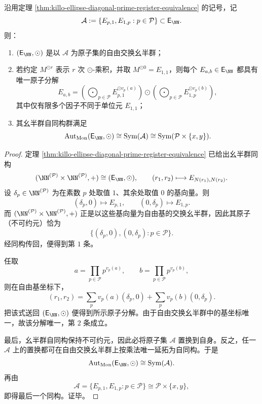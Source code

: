 \begin{theorem}[整数轴对齐椭圆半群的自由交换原子分解]\label{thm:xi-integer-ellipse-free-commutative-monoid}
沿用定理 \ref{thm:killo-ellipse-diagonal-prime-register-equivalence} 的记号，记
\[
\mathcal A:=\{E_{p,1},E_{1,p}:p\in\mathcal P\}\subset \mathsf E_{\NN}.
\]
则：
\begin{enumerate}
  \item \((\mathsf E_{\NN},\odot)\) 是以 \(\mathcal A\) 为原子集的自由交换幺半群；
  \item 若约定 \(M^{\odot r}\) 表示 \(r\) 次 \(\odot\)-乘积，并取 \(M^{\odot 0}=E_{1,1}\)，则每个 \(E_{a,b}\in\mathsf E_{\NN}\) 都具有唯一原子分解
  \[
  E_{a,b}
  =
  \left(\bigodot_{p\in\mathcal P}E_{p,1}^{\odot v_p(a)}\right)
  \odot
  \left(\bigodot_{p\in\mathcal P}E_{1,p}^{\odot v_p(b)}\right),
  \]
  其中仅有限多个因子不同于单位元 \(E_{1,1}\)；
  \item 其幺半群自同构群满足
  \[
  \operatorname{Aut}_{\mathrm{Mon}}(\mathsf E_{\NN},\odot)
  \cong
  \mathrm{Sym}(\mathcal A)
  \cong
  \mathrm{Sym}(\mathcal P\times\{x,y\}).
  \]
\end{enumerate}
\end{theorem}
\begin{proof}
定理 \ref{thm:killo-ellipse-diagonal-prime-register-equivalence} 已给出幺半群同构
\[
(\NN^{(\mathcal P)}\times \NN^{(\mathcal P)},+)
\cong
(\mathsf E_{\NN},\odot),\qquad
(r_1,r_2)\longmapsto E_{N(r_1),N(r_2)}.
\]
设 \(\delta_p\in\NN^{(\mathcal P)}\) 为在素数 \(p\) 处取值 \(1\)、其余处取值 \(0\) 的基向量。则
\[
(\delta_p,0)\longmapsto E_{p,1},
\qquad
(0,\delta_p)\longmapsto E_{1,p}.
\]
而 \((\NN^{(\mathcal P)}\times \NN^{(\mathcal P)},+)\) 正是以这些基向量为自由基的交换幺半群，因此其原子（不可约元）恰为
\[
\{(\delta_p,0),(0,\delta_p):p\in\mathcal P\}.
\]
经同构传回，便得到第 \(1\) 条。

任取
\[
a=\prod_{p\in\mathcal P}p^{v_p(a)},
\qquad
b=\prod_{p\in\mathcal P}p^{v_p(b)},
\]
则在自由基坐标下，
\[
(r_1,r_2)=\sum_{p}v_p(a)(\delta_p,0)+\sum_{p}v_p(b)(0,\delta_p).
\]
把该式送回 \((\mathsf E_{\NN},\odot)\) 便得到所示原子分解。由于自由交换幺半群中的基坐标唯一，故该分解唯一，第 \(2\) 条成立。

最后，幺半群自同构保持不可约元，因此必将原子集 \(\mathcal A\) 置换到自身。反之，任一 \(\mathcal A\) 上的置换都可在自由交换幺半群上按乘法唯一延拓为自同构。于是
\[
\operatorname{Aut}_{\mathrm{Mon}}(\mathsf E_{\NN},\odot)
\cong
\mathrm{Sym}(\mathcal A).
\]
再由
\[
\mathcal A=\{E_{p,1},E_{1,p}:p\in\mathcal P\}
\cong
\mathcal P\times\{x,y\},
\]
即得最后一个同构。证毕。
\end{proof}

